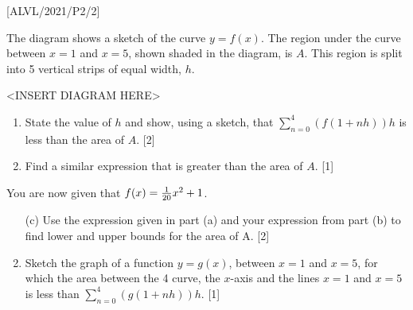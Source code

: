 \item {[}ALVL/2021/P2/2{]}

The diagram shows a sketch of the curve $y=f(x)$. The region under
the curve between $x=1$ and $x=5$, shown shaded in the diagram,
is $A$. This region is split into 5 vertical strips of equal width,
$h$.
\noindent \begin{center}
<INSERT DIAGRAM HERE>
\par\end{center}
\begin{enumerate}
\item State the value of $h$ and show, using a sketch, that $\sum_{n=0}^{4}\left(f\left(1+nh\right)\right)h$
is less than the area of $A$. \hfill{} {[}2{]}
\item Find a similar expression that is greater than the area of $A$. \hfill{}
{[}1{]}
\end{enumerate}
You are now given that $f(x)=\text{\ensuremath{\frac{1}{20}x^{2}+1}}$. 
\begin{enumerate}
\item[(c)]  Use the expression given in part (a) and your expression from part
(b) to find lower and upper bounds for the area of A. \hfill{} {[}2{]}
\item Sketch the graph of a function $y=g(x)$, between $x=1$ and $x=5$,
for which the area between the 4 curve, the $x$-axis and the lines
$x=1$ and $x=5$ is less than $\sum_{n=0}^{4}(g(1+nh))h$. \hfill{}{[}1{]}
\end{enumerate}
